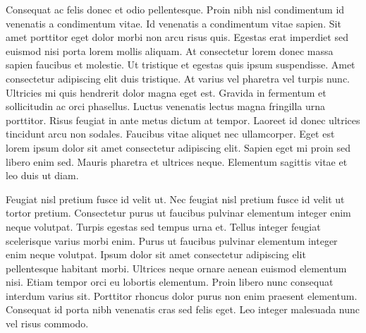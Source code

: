 \documentclass{article} %
\begin{document}
    Consequat ac felis donec et odio pellentesque. Proin nibh nisl condimentum id venenatis a condimentum vitae. Id venenatis a condimentum vitae sapien. Sit amet porttitor eget dolor morbi non arcu risus quis. Egestas erat imperdiet sed euismod nisi porta lorem mollis aliquam. At consectetur lorem donec massa sapien faucibus et molestie. Ut tristique et egestas quis ipsum suspendisse. Amet consectetur adipiscing elit duis tristique. At varius vel pharetra vel turpis nunc. Ultricies mi quis hendrerit dolor magna eget est. Gravida in fermentum et sollicitudin ac orci phasellus. Luctus venenatis lectus magna fringilla urna porttitor. Risus feugiat in ante metus dictum at tempor. Laoreet id donec ultrices tincidunt arcu non sodales. Faucibus vitae aliquet nec ullamcorper. Eget est lorem ipsum dolor sit amet consectetur adipiscing elit. Sapien eget mi proin sed libero enim sed. Mauris pharetra et ultrices neque. Elementum sagittis vitae et leo duis ut diam.
    
    Feugiat nisl pretium fusce id velit ut. Nec feugiat nisl pretium fusce id velit ut tortor pretium. Consectetur purus ut faucibus pulvinar elementum integer enim neque volutpat. Turpis egestas sed tempus urna et. Tellus integer feugiat scelerisque varius morbi enim. Purus ut faucibus pulvinar elementum integer enim neque volutpat. Ipsum dolor sit amet consectetur adipiscing elit pellentesque habitant morbi. Ultrices neque ornare aenean euismod elementum nisi. Etiam tempor orci eu lobortis elementum. Proin libero nunc consequat interdum varius sit. Porttitor rhoncus dolor purus non enim praesent elementum. Consequat id porta nibh venenatis cras sed felis eget. Leo integer malesuada nunc vel risus commodo.
\end{document}
